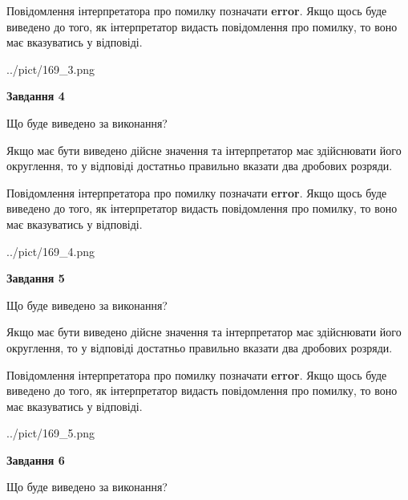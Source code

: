 \documentclass[12pt, ukrainian]{article}
\begin{document}
{\begin {Large}
Повідомлення інтерпретатора про помилку позначати \textbf{error}.
Якщо щось буде виведено до того, як інтерпретатор видасть повідомлення про помилку, 
то воно має вказуватись у відповіді. \par

\begin{center}
	{../pict/169_3.png}
\end{center}
\newpage

{\begin {center}\textbf{Завдання 4}\end {center}}\par
Що буде виведено за виконання? \par

Якщо має бути виведено дійсне значення та інтерпретатор має здійснювати його округлення, 
то у відповіді достатньо правильно вказати два дробових розряди.

Повідомлення інтерпретатора про помилку позначати \textbf{error}.
Якщо щось буде виведено до того, як інтерпретатор видасть повідомлення про помилку, 
то воно має вказуватись у відповіді. \par

\begin{center}
	{../pict/169_4.png}
\end{center}
\newpage

{\begin {center}\textbf{Завдання 5}\end {center}}\par
Що буде виведено за виконання? \par

Якщо має бути виведено дійсне значення та інтерпретатор має здійснювати його округлення, 
то у відповіді достатньо правильно вказати два дробових розряди.

Повідомлення інтерпретатора про помилку позначати \textbf{error}.
Якщо щось буде виведено до того, як інтерпретатор видасть повідомлення про помилку, 
то воно має вказуватись у відповіді. \par

\begin{center}
	{../pict/169_5.png}
\end{center}
\newpage

{\begin {center}\textbf{Завдання 6}\end {center}}\par
Що буде виведено за виконання? \par


\end{Large}}
\end{document}

